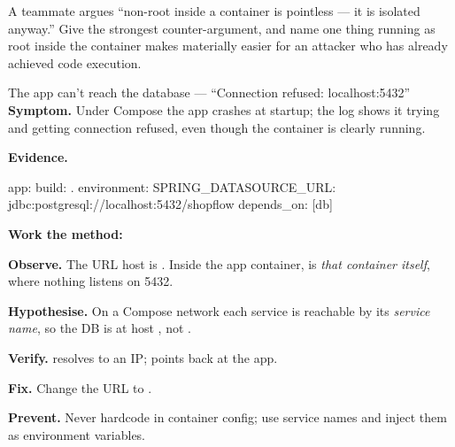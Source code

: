\begin{thinkbox}
A teammate argues ``non-root inside a container is pointless --- it is isolated anyway.'' Give the strongest counter-argument, and name one thing running as root inside the container makes materially easier for an attacker who has already achieved code execution.
\end{thinkbox}


\begin{debuglab}{The app can't reach the database --- ``Connection refused: localhost:5432''}
\textbf{Symptom.} Under Compose the app crashes at startup; the log shows it trying  and getting connection refused, even though the  container is clearly running.

\smallskip\textbf{Evidence.}
\begin{yamlbox}
  app:
    build: .
    environment:
      SPRING_DATASOURCE_URL: jdbc:postgresql://localhost:5432/shopflow
    depends_on: [db]
\end{yamlbox}

\textbf{Work the method:}
\begin{tickcheck}
  \item \textbf{Observe.} The URL host is . Inside the app container,  is \emph{that container itself}, where nothing listens on 5432.
  \item \textbf{Hypothesise.} On a Compose network each service is reachable by its \emph{service name}, so the DB is at host , not .
  \item \textbf{Verify.}  resolves to an IP;  points back at the app.
  \item \textbf{Fix.} Change the URL to .
  \item \textbf{Prevent.} Never hardcode  in container config; use service names and inject them as environment variables.
\end{tickcheck}
\end{debuglab}

